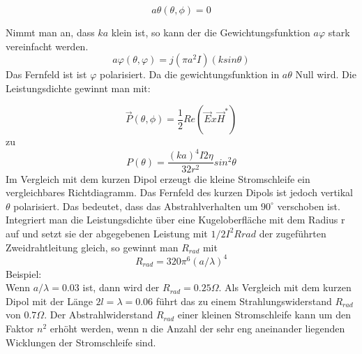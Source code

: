 \begin{equation}
a\theta(\theta, \phi) =0
\end{equation}

Nimmt man  an, dass $ka$ klein ist, so kann der die Gewichtungsfunktion $a\varphi$ stark vereinfacht werden.
\begin{equation}
a\varphi(\theta,\varphi)=j(\pi a^{2}I)(k sin \theta)
\end{equation}
Das Fernfeld ist  ist  $\varphi$ polarisiert. Da die gewichtungsfunktion in $a\theta$ Null wird.  Die Leistungsdichte gewinnt man mit: 

\begin{equation}
\vec P(\theta,\phi)=\frac{1}{2}Re(\vec E x \vec H^*)
\end{equation}
zu
\begin{equation}
P(\theta)=\frac{(ka)^{4}I{2}\eta}{32r^{2}}sin^{2}\theta
\end{equation}
Im Vergleich mit dem kurzen Dipol erzeugt die kleine Stromschleife ein vergleichbares Richtdiagramm. Das Fernfeld des kurzen Dipols ist jedoch vertikal $\theta$ polarisiert. Das bedeutet, dass das Abstrahlverhalten um $90^\circ$ verschoben ist. Integriert man die Leistungsdichte über eine Kugeloberfläche mit dem Radius r  auf und setzt sie der abgegebenen Leistung mit $1/2 I^{2}Rrad $ der zugeführten Zweidrahtleitung gleich, so gewinnt man $R_{rad}$ mit 
\begin{equation}
R_{rad} = 320\pi^{6} (a/\lambda)^{4}\label{eq:RradLoop}
\end{equation}
Beispiel:\\
Wenn $a/\lambda = 0.03$ ist, dann wird der $R_{rad} = 0.25\Omega$. Als Vergleich mit dem kurzen Dipol mit der Länge $2l=\lambda= 0.06$ führt das zu einem Strahlungswiderstand $R_{rad}$ von $0.7\Omega$.  Der Abstrahlwiderstand $R_{rad}$ einer kleinen Stromschleife kann um den Faktor $n^{2}$ erhöht werden, wenn n die Anzahl der sehr eng aneinander liegenden Wicklungen der Stromschleife sind. 



